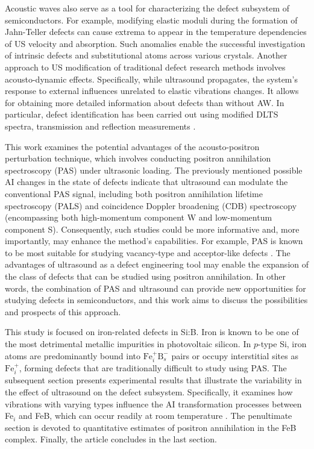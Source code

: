 \documentclass{ttp}
\begin{document}
Acoustic waves also serve as a tool for characterizing the defect subsystem of semiconductors.
For example, modifying elastic moduli during the formation of Jahn-Teller defects can cause extrema to appear in the temperature dependencies of US velocity and absorption.
Such anomalies enable the successful investigation of intrinsic defects \cite{USM:Mitsumoto2014, USM:SEYIDOV2016} 
and substitutional atoms \cite{USM:Zhevstovskikh, USM:YI2009} across various crystals.
Another approach to US modification of traditional defect research methods involves acousto-dynamic effects. 
Specifically, while ultrasound propagates, the system's response to external influences unrelated to elastic vibrations changes. 
It allows for obtaining more detailed information about defects than without AW.
In particular, defect identification has been carried out using modified DLTS spectra,  
transmission and reflection measurements \cite{Kor1996, Ostrovskii2001, OSTROVSKII2000, SST:USmethod}.

This work examines the potential advantages of the acousto-positron perturbation technique, 
which involves conducting positron annihilation spectroscopy (PAS) under ultrasonic loading. 
The previously mentioned possible AI changes in the state of defects indicate that ultrasound can modulate the conventional PAS signal, 
including both positron annihilation lifetime spectroscopy (PALS) and coincidence Doppler broadening (CDB) spectroscopy 
(encompassing both high-momentum component W and low-momentum component S).
Consequently, such studies could be more informative and, more importantly, may enhance the method's capabilities.
For example, PAS is known to be most suitable for studying vacancy-type and acceptor-like defects \cite{tuomisto2019}. 
The advantages of ultrasound as a defect engineering tool \cite{Olikh2018JAP} may enable the expansion 
of the class of defects that can be studied using positron annihilation. 
In other words, the combination of PAS and ultrasound can provide new opportunities for studying defects in semiconductors, 
and this work aims to discuss the possibilities and prospects of this approach.

This study is focused on iron-related defects in Si:B.
Iron is known to be one of the most detrimental metallic impurities in photovoltaic silicon.
In $p$-type Si, iron atoms are predominantly bound into $\mathrm{Fe}_i^+\mathrm{B}_s^−$ pairs 
or occupy interstitial sites as $\mathrm{Fe}_i^+$, 
forming defects that are traditionally difficult to study using PAS.
The subsequent section presents experimental results that illustrate the variability in the effect of ultrasound on the defect subsystem.
Specifically, it examines how vibrations with varying types influence the AI transformation processes 
between Fe$_i$ and FeB, which can occur readily at room temperature \cite{FeBAssJAP2014}. 
The penultimate section is devoted to quantitative estimates of positron annihilation in the FeB complex. 
Finally, the article concludes in the last section.
\end{document}
